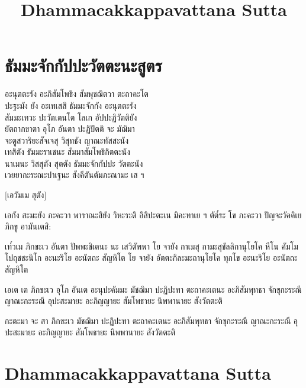 \documentclass[
  babelLanguage=thai,
  final,
]{chantingbook}
\title{Dhammacakkappavattana Sutta}
\begin{document}
\mainmatter

\usePsMarksTitleOnly

\artopttrue

\renewcommand\chapterTitleFont{\thaiFont}

\chapter{ธัมมะจักกัปปะวัตตะนะสูตร}

\thaiText
\renewcommand{\thaiTitle}{}

\begin{leader}

อะนุตตะรัง อะภิสัมโพธิง สัมพุชฌิตวา ตะถาคะโต\\
ปะฐะมัง ยัง อะเทเสสิ ธัมมะจักกัง อะนุตตะรัง\\
สัมมะเทวะ ปะวัตเตนโต โลเก อัปปะฏิวัตติยัง\\
ยัตถากขาตา อุโภ อันตา ปะฏิปัตติ จะ มัฌิมา\\
จะตูสวาริยะสัจเจสุ วิสุทธัง ญาณะทัสสะนัง\\
เทสิตัง ธัมมะราเชนะ สัมมาสัมโพธิกิตตะนัง\\
นาเมนะ วิสสุตัง สุตตัง ธัมมะจักกัปปะ วัตตะนัง\\
เวยยากะระณะปาเฐนะ สังคีตันตัมภะณามะ เส ฯ

\end{leader}

[เอวัมเม สุตัง] 

เอกัง สะมะยัง ภะคะวา พาราณะสิยัง วิหะระติ อิสิปะตะเน
มิคะทาเย ฯ ตัต๎ระ โข ภะคะวา ปัญจะวัคคิเย ภิกขู อามันเตสิ:

เท๎วเม ภิกขะเว อันตา ปัพพะชิเตนะ นะ เสวิตัพพา โย จายัง กาเมสุ
กามะสุขัลลิกานุโยโค หีโน คัมโม โปถุชชะนิโก อะนะริโย อะนัตถะ
สัญหิโต โย จายัง อัตตะกิละมะถานุโยโค ทุกโข อะนะริโย อะนัตถะสัญหิโต

เอเต เต ภิกขะเว อุโภ อันเต อะนุปะคัมมะ มัชฌิมา ปะฏิปะทา ตะถาคะเตนะ อะภิสัมพุทธา
จักขุกะระณี ญาณะกะระณี อุปะสะมายะ อะภิญญายะ สัมโพธายะ นิพพานายะ สังวัตตะติ

\enlargethispage{\baselineskip}

กะตะมา จะ สา ภิกขะเว มัชฌิมา ปะฏิปะทา ตะถาคะเตนะ อะภิสัมพุทธา จักขุกะระณี
ญาณะกะระณี อุปะสะมายะ อะภิญญายะ สัมโพธายะ นิพพานายะ สังวัตตะติ

\clearpage

\renewcommand\chapterTitleFont{\ubuntuXMedium}

\chapter{Dhammacakkappavattana Sutta}%
\end{document}
